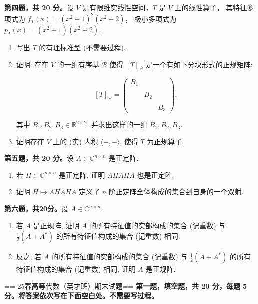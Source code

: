 \textbf{第四题，共 20 分。}设 $V$ 是有限维实线性空间，$T$ 是 $V$ 上的线性算子，
其特征多项式为 \(f_{T}(x) = (x^{2} + 1)^{2}(x^{2} + 2)\)，
极小多项式为 \(p_{T}(x) = (x^{2} + 1)(x^{2} + 2)\).

\begin{enumerate}
\item
  写出 $T$ 的有理标准型 (不需要过程).
\item
  证明: 存在 \(V\) 的一组有序基 \(\mathcal{B}\) 
  使得 \([T]_{\mathcal{B}}\) 是一个有如下分块形式的正规矩阵:

\[[T]_{\mathcal{B}} = \begin{pmatrix} B_{1} & & \\ \\ & B_{2} & \\ \\ & & B_{3} \end{pmatrix},\]

其中 \(B_{1}, B_{2}, B_{3} \in \mathbb{R}^{2 \times 2}\). 
并求出这样的一组 \(B_{1}, B_{2}, B_{3}\).

\item
  证明存在 \(V\) 上的 (实) 内积 \(\langle -, - \rangle\), 使得 \(T\) 为正规算子.
\end{enumerate}

\textbf{第五题，共 20 分。}设 \(A \in \mathbb{C}^{n \times n}\) 是正定阵.

\begin{enumerate}
\item
  若 \(H \in \mathbb{C}^{n \times n}\) 是正定阵, 证明 $AHAHA$ 也是正定阵.
\item
  证明 \(H \mapsto AHAHA\) 定义了 \(n\) 阶正定阵全体构成的集合到自身的一个双射.
\end{enumerate}

\textbf{第六题，共20分。}设 \(A \in \mathbb{C}^{n \times n}\).

\begin{enumerate}
\def\labelenumi{\arabic{enumi}.}
\item
  若 $A$ 是正规阵, 证明 $A$ 的所有特征值的实部构成的集合 (记重数) 
  与 \(\frac{1}{2}(A + A^{*})\) 的所有特征值构成的集合 (记重数) 相同.
\item
  反之, 若 $A$ 的所有特征值的实部构成的集合 (记重数) 
  与 \(\frac{1}{2}(A+A^{*})\) 的所有特征值构成的集合 (记重数) 相同, 
  证明 $A$ 是正规阵.
\end{enumerate}

== 25春高等代数（英才班）期末试题==
\textbf{第一题，填空题，共 20 分，每题 5 分。将答案依次写在下面空白处。不需要写过程。}

